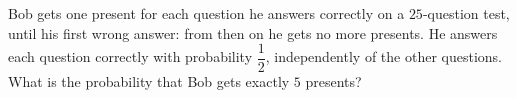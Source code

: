 Bob gets one present for each question he answers correctly on a $25$-question test, until his first wrong answer: from then on he gets no more presents. He answers each question correctly with probability $\dfrac12$, independently of the other questions. What is the probability that Bob gets exactly $5$ presents?
